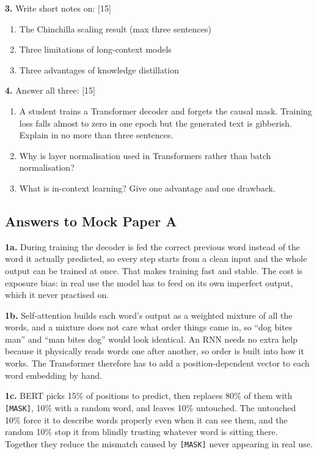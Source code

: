 \documentclass[11pt]{article}
\begin{document}
\textbf{3.} Write short notes on: \hfill [15]
\begin{enumerate}[label=\alph*.]
  \item The Chinchilla scaling result (max three sentences)
  \item Three limitations of long-context models
  \item Three advantages of knowledge distillation
\end{enumerate}

\textbf{4.} Answer all three: \hfill [15]
\begin{enumerate}[label=\alph*.]
  \item A student trains a Transformer decoder and forgets the causal mask. Training loss falls almost to zero in one epoch but the generated text is gibberish. Explain in no more than three sentences.
  \item Why is layer normalisation used in Transformers rather than batch normalisation?
  \item What is in-context learning? Give one advantage and one drawback.
\end{enumerate}

\subsection*{Answers to Mock Paper A}

\textbf{1a.} During training the decoder is fed the correct previous word instead of the word
it actually predicted, so every step starts from a clean input and the whole output can be
trained at once. That makes training fast and stable. The cost is exposure bias: in real use
the model has to feed on its own imperfect output, which it never practised on.

\textbf{1b.} Self-attention builds each word's output as a weighted mixture of all the words,
and a mixture does not care what order things came in, so ``dog bites man'' and ``man bites
dog'' would look identical. An RNN needs no extra help because it physically reads words one
after another, so order is built into how it works. The Transformer therefore has to add a
position-dependent vector to each word embedding by hand.

\textbf{1c.} BERT picks 15\% of positions to predict, then replaces 80\% of them with
\texttt{[MASK]}, 10\% with a random word, and leaves 10\% untouched. The untouched 10\% force
it to describe words properly even when it can see them, and the random 10\% stop it from
blindly trusting whatever word is sitting there. Together they reduce the mismatch caused by
\texttt{[MASK]} never appearing in real use.
\end{document}
